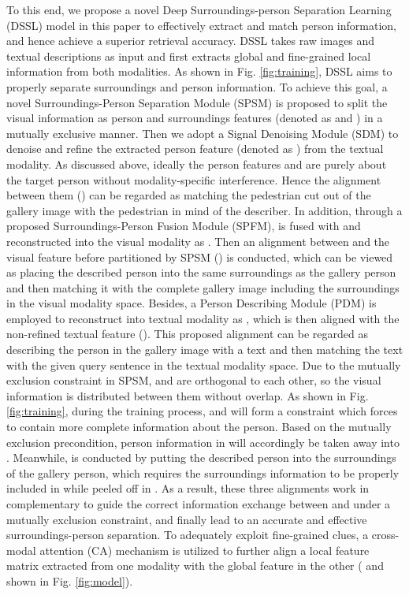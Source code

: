 \documentclass[sigconf]{acmart}
\begin{document}
To this end, we propose a novel Deep Surroundings-person Separation Learning (DSSL) model in this paper to effectively extract and match person information, and hence achieve a superior retrieval accuracy. DSSL takes raw images and textual descriptions as input and first extracts global and fine-grained local information from both modalities. As shown in Fig. \ref{fig:training}, DSSL aims to properly separate surroundings and person information. To achieve this goal, a novel Surroundings-Person Separation Module (SPSM) is proposed to split the visual information as person and surroundings features (denoted as  and ) in a mutually exclusive manner. Then we adopt a Signal Denoising Module (SDM) to denoise and refine the extracted person feature (denoted as ) from the textual modality. As discussed above, ideally the person features  and  are purely about the target person without modality-specific interference. Hence the alignment between them () can be regarded as matching the pedestrian cut out of the gallery image with the pedestrian in mind of the describer. In addition, through a proposed Surroundings-Person Fusion Module (SPFM),  is fused with  and reconstructed into the visual modality as . Then an alignment between  and the visual feature before partitioned by SPSM () is conducted, which can be viewed as placing the described person into the same surroundings as the gallery person and then matching it with the complete gallery image including the surroundings in the visual modality space. Besides, a Person Describing Module (PDM) is employed to reconstruct  into textual modality as , which is then aligned with the non-refined textual feature (). This proposed alignment can be regarded as describing the person in the gallery image with a text and then matching the text with the given query sentence in the textual modality space. Due to the mutually exclusion constraint in SPSM,  and  are orthogonal to each other, so the visual information is distributed between them without overlap. As shown in Fig. \ref{fig:training}, during the training process,  and  will form a constraint which forces  to contain more complete information about the person. Based on the mutually exclusion precondition, person information in  will accordingly be taken away into . Meanwhile,  is conducted by putting the described person into the surroundings of the gallery person, which requires the surroundings information to be properly included in  while peeled off in . As a result, these three alignments work in complementary to guide the correct information exchange between  and  under a mutually exclusion constraint, and finally lead to an accurate and effective surroundings-person separation. To adequately exploit fine-grained clues, a cross-modal attention (CA) mechanism \cite{niu2020improving, wang2020img} is utilized to further align a local feature matrix extracted from one modality with the global feature in the other ( and  shown in Fig. \ref{fig:model}).
\end{document}
